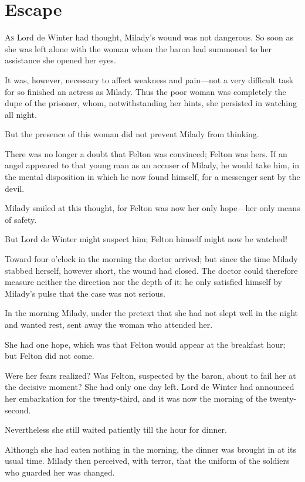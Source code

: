 
\chapter{Escape}

\lettrine[]{A}{s} Lord de Winter had thought, Milady's wound was not dangerous. So soon as she was left alone with the woman whom the baron had summoned to her assistance she opened her eyes. 

It was, however, necessary to affect weakness and pain---not a very difficult task for so finished an actress as Milady. Thus the poor woman was completely the dupe of the prisoner, whom, notwithstanding her hints, she persisted in watching all night. 

But the presence of this woman did not prevent Milady from thinking. 

There was no longer a doubt that Felton was convinced; Felton was hers. If an angel appeared to that young man as an accuser of Milady, he would take him, in the mental disposition in which he now found himself, for a messenger sent by the devil. 

Milady smiled at this thought, for Felton was now her only hope---her only means of safety. 

But Lord de Winter might suspect him; Felton himself might now be watched! 

Toward four o'clock in the morning the doctor arrived; but since the time Milady stabbed herself, however short, the wound had closed. The doctor could therefore measure neither the direction nor the depth of it; he only satisfied himself by Milady's pulse that the case was not serious. 

In the morning Milady, under the pretext that she had not slept well in the night and wanted rest, sent away the woman who attended her. 

She had one hope, which was that Felton would appear at the breakfast hour; but Felton did not come. 

Were her fears realized? Was Felton, suspected by the baron, about to fail her at the decisive moment? She had only one day left. Lord de Winter had announced her embarkation for the twenty-third, and it was now the morning of the twenty-second. 

Nevertheless she still waited patiently till the hour for dinner. 

Although she had eaten nothing in the morning, the dinner was brought in at its usual time. Milady then perceived, with terror, that the uniform of the soldiers who guarded her was changed. 

